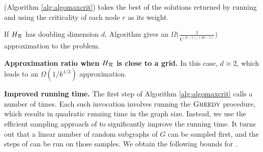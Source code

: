 
(Algorithm \ref{alg:algomaxcrit}) takes the best of the solutions returned by running \algosubmod{} and \algomaxst{} using the criticality of each node $r$ as its weight. %

\begin{corollary}
\label{cor:maxcrit}
If $H_{\mathcal{R}}$ has doubling dimension $d$, Algorithm \algomaxcrit{} gives an $\Omega\Big(\frac{1}{k^{(d-1)/(2d-1)}}\Big)$ approximation to the \maxcrit{} problem. 
\end{corollary}

\noindent
\textbf{Approximation ratio when $H_{\mathcal{R}}$ is close to a grid.} In this case, $d \approx 2$, which leads to an $\Omega(1/k^{1/3})$ approximation.
\newline

\noindent
\textbf{Improved running time.} The first step of Algorithm \ref{alg:algomaxcrit}
calls \algosubmod{} a number of times. Each such invocation involves running the $\textsc{Greedy}{}$ procedure,
which results in quadratic running time in the graph size. Instead, we use the efficient sampling approach of
\cite{borgs:soda14} to significantly improve the running time. It turns out that
a linear number of random subgraphs of $G$ can be sampled first, and the steps of
\algosubmod{} can be run on those samples. We obtain the following bounds for \algomaxcrit{}. %

